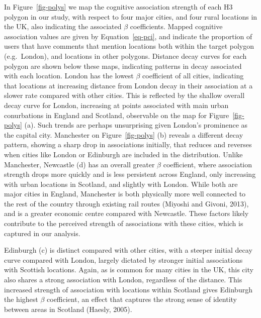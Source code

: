 \documentclass[
  letterpaper,
  11pt,
  english,
  onehalfspacing,
  headsepline]{MastersDoctoralThesis}
\begin{document}
In Figure~\ref{fig-polys} we map the cognitive association strength of
each H3 polygon in our study, with respect to four major cities, and
four rural locations in the UK, also indicating the associated \(\beta\)
coefficients. Mapped cognitive association values are given by
Equation~\ref{eq-pci}, and indicate the proportion of users that have
comments that mention locations both within the target polygon
(e.g.~London), and locations in other polygons. Distance decay curves
for each polygon are shown below these maps, indicating patterns in
decay associated with each location. London has the lowest \(\beta\)
coefficient of all cities, indicating that locations at increasing
distance from London decay in their association at a slower rate
compared with other cities. This is reflected by the shallow overall
decay curve for London, increasing at points associated with main urban
conurbations in England and Scotland, observable on the map for
Figure~\ref{fig-polys} (a). Such trends are perhaps unsurprising given
London's prominence as the capital city. Manchester on
Figure~\ref{fig-polys} (b) reveals a different decay pattern, showing a
sharp drop in associations initially, that reduces and reverses when
cities like London or Edinburgh are included in the distribution. Unlike
Manchester, Newcastle (d) has an overall greater \(\beta\) coefficient,
where association strength drops more quickly and is less persistent
across England, only increasing with urban locations in Scotland, and
slightly with London. While both are major cities in England, Manchester
is both physically more well connected to the rest of the country
through existing rail routes (Miyoshi and Givoni, 2013), and is a
greater economic centre compared with Newcastle. These factors likely
contribute to the perceived strength of associations with these cities,
which is captured in our analysis.

Edinburgh (c) is distinct compared with other cities, with a steeper
initial decay curve compared with London, largely dictated by stronger
initial associations with Scottish locations. Again, as is common for
many cities in the UK, this city also shares a strong association with
London, regardless of the distance. This increased strength of
association with locations within Scotland gives Edinburgh the highest
\(\beta\) coefficient, an effect that captures the strong sense of
identity between areas in Scotland (Haesly, 2005).
\end{document}
